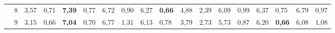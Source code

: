 \documentclass[conference]{IEEEtran}
\begin{document}
\begin{table}[]
\begin{tabular}{|cl|ll|ll|ll|ll|ll|ll|ll|ll|}
		\multicolumn{1}{|c|}{}                    & 8          & \multicolumn{1}{l|}{3,57}          & 0,71          & \multicolumn{1}{l|}{\textbf{7,39}}  & 0,77          & \multicolumn{1}{l|}{6,72}           & 0,90          & \multicolumn{1}{l|}{6,27}          & \textbf{0,66} & \multicolumn{1}{l|}{4,88}                 & 2,39 & \multicolumn{1}{l|}{6,09}           & 0,99 & \multicolumn{1}{l|}{6,37}           & 0,75          & \multicolumn{1}{l|}{6,79}           & 0,97 \\ \cline{2-18} 
		\multicolumn{1}{|c|}{}                    & 9          & \multicolumn{1}{l|}{3,15}          & 0,66          & \multicolumn{1}{l|}{\textbf{7,04}}  & 0,70          & \multicolumn{1}{l|}{6,77}           & 1,31          & \multicolumn{1}{l|}{6,13}          & 0,78          & \multicolumn{1}{l|}{3,79}                 & 2,73 & \multicolumn{1}{l|}{5,73}           & 0,87 & \multicolumn{1}{l|}{6,20}           & \textbf{0,66} & \multicolumn{1}{l|}{6,08}           & 1,08 \\ \hline
	\end{tabular}
\end{table}
\end{document}
